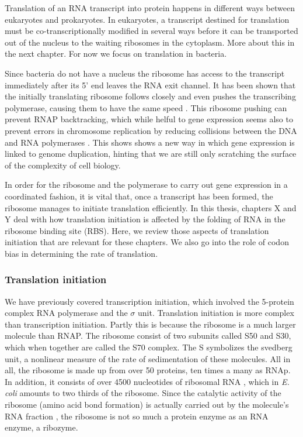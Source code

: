 %
Translation of an RNA transcript into protein happens in different ways between
eukaryotes and prokaryotes. In eukaryotes, a transcript destined for
translation must be co-transcriptionally modified in several ways before it can
be transported out of the nucleus to the waiting ribosomes in the cytoplasm.
More about this in the next chapter. For now we focus on translation in
bacteria.

Since bacteria do not have a nucleus the ribosome has access to the
transcript immediately after its 5' end leaves the RNA exit channel. It has
been shown that the initially translating ribosome follows closely and even
pushes the transcribing polymerase, causing them to have the same speed
\cite{proshkin_cooperation_2010}. This ribosome pushing can prevent RNAP
backtracking, which while helful to gene expression seems also to prevent
errors in chromosome replication by reducing collisions between the DNA and RNA
polymerases \cite{dutta_linking_2011}. This shows shows a new way in which
gene expression is linked to genome duplication, hinting that we are still only
scratching the surface of the complexity of cell biology.

In order for the ribosome and the polymerase to carry out gene expression in
a coordinated fashion, it is vital that, once a transcript has
been formed, the ribosome manages to initiate translation efficiently. In this
thesis, chapters X and Y deal with how translation initiation is affected by
the folding of RNA in the ribosome binding site (RBS). Here, we review those
aspects of translation initiation that are relevant for these chapters. We also
go into the role of codon bias in determining the rate of translation.

\subsubsection{Translation initiation}

We have previously covered transcription initiation, which involved the
5-protein complex RNA polymerase and the $\sigma$ unit. Translation initiation
is more complex than transcription initiation. Partly this is because the
ribosome is a much larger molecule than RNAP. The ribosome consist of two
subunits called S50 and S30, which when together are called the S70 complex.
The S symbolizes the svedberg unit, a nonlinear measure of the rate of
sedimentation of these molecules. All in all, the ribosome is made up from over
50 proteins, ten times a many as RNAp. In addition, it consists of over 4500
nucleotides of ribosomal RNA \cite{laursen_initiation_2005}, which in
\textit{E. coli} amounts to two thirds of the ribosome. Since the catalytic
activity of the ribosome (amino acid bond formation) is actually carried out by
the molecule's RNA fraction \cite{steitz_rna_2003}, the ribosome is not so much
a protein enzyme as an RNA enzyme, a ribozyme.

